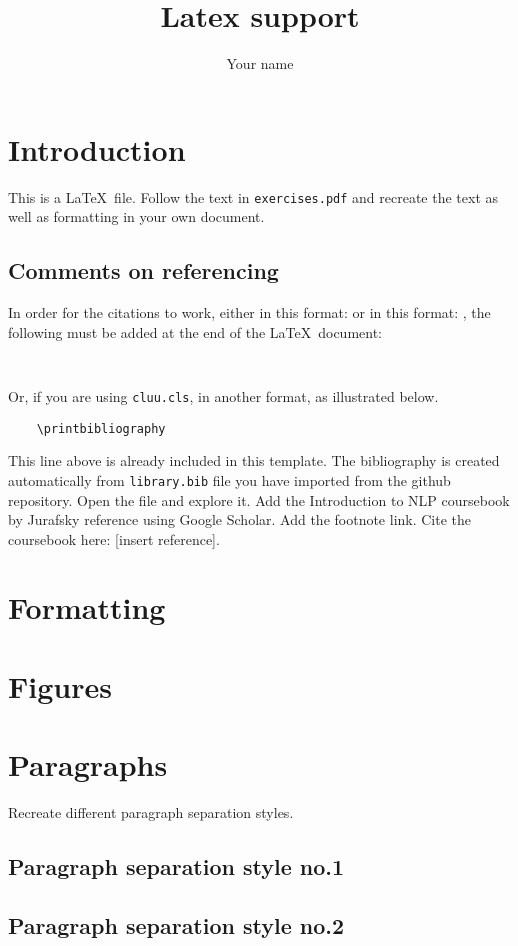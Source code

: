 \documentclass[wide]{cluu}
\title{Latex support}
\author{Your name}
\date{}
\begin{document}
\maketitle


\section{Introduction}
This is a \LaTeX\ file. Follow the text in \texttt{exercises.pdf}  and recreate the text as well as formatting in your own document.

\subsection{Comments on referencing}
In order for the citations to work, either in this format: \citep{devlin2018bert} or in this format: \cite{devlin2018bert}, the following must be added at the end of the \LaTeX\ document:
\begin{verbatim}
    
\end{verbatim}
Or, if you are using \texttt{cluu.cls}, in another format, as illustrated below.
\begin{verbatim}
    \printbibliography
\end{verbatim}
This line above is already included in this template. The bibliography is created automatically from \texttt{library.bib} file you have imported from the github repository. Open the file and explore it. Add the Introduction to NLP coursebook by Jurafsky reference using Google Scholar. Add the footnote link. Cite the coursebook here: [insert reference]. 

\section{Formatting}


\section{Figures}


\section{Paragraphs}
Recreate different paragraph separation styles.

\subsection{Paragraph separation style no.1}


\subsection{Paragraph separation style no.2}


\setlength{\bibsep}{7pt}

\end{document}
